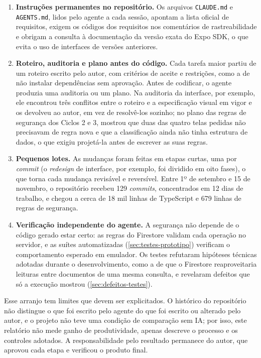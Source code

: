 \begin{enumerate}
  \item \textbf{Instruções permanentes no repositório.} Os arquivos
        \texttt{CLAUDE.md} e \texttt{AGENTS.md}, lidos pelo agente a cada
        sessão, apontam a lista oficial de requisitos, exigem os códigos
        dos requisitos nos comentários de rastreabilidade e obrigam a
        consulta à documentação da versão exata do Expo SDK, o que evita
        o uso de interfaces de versões anteriores.
  \item \textbf{Roteiro, auditoria e plano antes do código.} Cada tarefa
        maior partiu de um roteiro escrito pelo autor, com critérios de
        aceite e restrições, como a de não instalar dependências sem
        aprovação. Antes de codificar, o agente produzia uma auditoria ou
        um plano. Na auditoria da interface, por exemplo, ele encontrou
        três conflitos entre o roteiro e a especificação visual em vigor e
        os devolveu ao autor, em vez de resolvê-los sozinho; no plano das
        regras de segurança dos Ciclos 2 e 3, mostrou que duas das quatro
        telas pedidas não precisavam de regra nova e que a classificação
        ainda não tinha estrutura de dados, o que exigiu projetá-la
        antes de escrever as suas regras.
  \item \textbf{Pequenos lotes.} As mudanças foram feitas em etapas
        curtas, uma por \textit{commit} (o \textit{redesign} de interface,
        por exemplo, foi dividido em oito fases), o que torna cada
        mudança revisável e reversível. Entre 1º de setembro e 15 de
        novembro, o repositório recebeu 129 \textit{commits}, concentrados
        em 12 dias de trabalho, e chegou a cerca de 18 mil linhas de
        TypeScript e 679 linhas de regras de segurança.
  \item \textbf{Verificação independente do agente.} A segurança não
        depende de o código gerado estar certo: as regras do Firestore
        validam cada operação no servidor, e as suítes automatizadas
        (\autoref{sec:testes-prototipo}) verificam o comportamento
        esperado em emulador. Os testes refutaram hipóteses técnicas
        adotadas durante o desenvolvimento, como a de que o Firestore
        reaproveitaria leituras entre documentos de uma mesma consulta, e
        revelaram defeitos que só a execução mostrou
        (\autoref{sec:defeitos-testes}).
\end{enumerate}

Esse arranjo tem limites que devem ser explicitados. O histórico do
repositório não distingue o que foi escrito pelo agente do que foi
escrito ou alterado pelo autor, e o projeto não teve uma condição de
comparação sem IA; por isso, este relatório não mede ganho de
produtividade, apenas descreve o processo e os controles adotados. A
responsabilidade pelo resultado permanece do autor, que aprovou cada
etapa e verificou o produto final.

